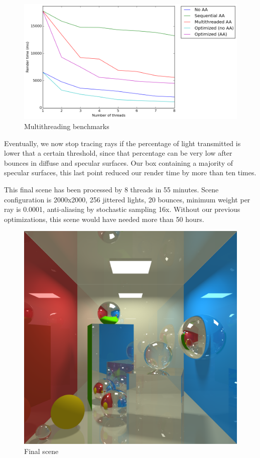 \begin{figure}[H]
\centering
\includegraphics[width=0.65\linewidth]{img/benchmarksThreads.png}
\caption{Multithreading benchmarks}
\end{figure}
\pagebreak

Eventually, we now stop tracing rays if the percentage of light transmitted is lower that a certain threshold, since that percentage can be very low after bounces in diffuse and specular surfaces. Our box containing a majority of specular surfaces, this last point reduced our render time by more than ten times.

This final scene has been processed by 8 threads in 55 minutes. Scene configuration is 2000x2000, 256 jittered lights, 20 bounces, minimum weight per ray is 0.0001, anti-aliasing by stochastic sampling 16x. Without our previous optimizations, this scene would have needed more than 50 hours.

\begin{figure}[H]
\centering
\includegraphics[width=0.9\linewidth]{img/final.png}
\caption{Final scene}
\end{figure}
